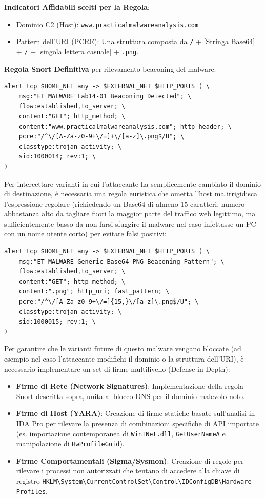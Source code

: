 \textbf{Indicatori Affidabili scelti per la Regola}:
\begin{itemize}
  \item Dominio C2 (Host): \texttt{www.practicalmalwareanalysis.com}
  \item Pattern dell'URI (PCRE): Una struttura composta da \texttt{/} + [Stringa Base64] + \texttt{/} + [singola lettera casuale] + \texttt{.png}.
\end{itemize}

\textbf{Regola Snort Definitiva} per rilevamento beaconing del malware:

\begin{lstlisting}
alert tcp $HOME_NET any -> $EXTERNAL_NET $HTTP_PORTS ( \
    msg:"ET MALWARE Lab14-01 Beaconing Detected"; \
    flow:established,to_server; \
    content:"GET"; http_method; \
    content:"www.practicalmalwareanalysis.com"; http_header; \
    pcre:"/^\/[A-Za-z0-9+\/=]+\/[a-z]\.png$/U"; \
    classtype:trojan-activity; \
    sid:1000014; rev:1; \
)
\end{lstlisting}

Per intercettare varianti in cui l'attaccante ha semplicemente cambiato il dominio di destinazione, è necessaria una regola euristica che ometta l'host ma irrigidisca l'espressione regolare (richiedendo un Base64 di almeno 15 caratteri, numero abbastanza alto da tagliare fuori la maggior parte del traffico web legittimo, ma sufficientemente basso da non farsi sfuggire il malware nel caso infettasse un PC con un nome utente corto) per evitare falsi positivi:

\begin{lstlisting}
alert tcp $HOME_NET any -> $EXTERNAL_NET $HTTP_PORTS ( \
    msg:"ET MALWARE Generic Base64 PNG Beaconing Pattern"; \
    flow:established,to_server; \
    content:"GET"; http_method; \
    content:".png"; http_uri; fast_pattern; \
    pcre:"/^\/[A-Za-z0-9+\/=]{15,}\/[a-z]\.png$/U"; \
    classtype:trojan-activity; \
    sid:1000015; rev:1; \
)
\end{lstlisting}

Per garantire che le varianti future di questo malware vengano bloccate (ad esempio nel caso l'attaccante modifichi il dominio o la struttura dell'URI), è necessario implementare un set di firme multilivello (Defense in Depth):

\begin{itemize}
  \item \textbf{Firme di Rete (Network Signatures)}: Implementazione della regola Snort descritta sopra, unita al blocco DNS per il dominio malevolo noto.
  \item \textbf{Firme di Host (YARA)}: Creazione di firme statiche basate sull'analisi in IDA Pro per rilevare la presenza di combinazioni specifiche di API importate (es. importazione contemporanea di \texttt{WinINet.dll}, \texttt{GetUserNameA} e manipolazione di \texttt{HwProfileGuid}).
  \item \textbf{Firme Comportamentali (Sigma/Sysmon)}: Creazione di regole per rilevare i processi non autorizzati che tentano di accedere alla chiave di registro \texttt{HKLM\textbackslash System\textbackslash CurrentControlSet\textbackslash Control\textbackslash IDConfigDB\textbackslash Hardware Profiles}.
\end{itemize}
